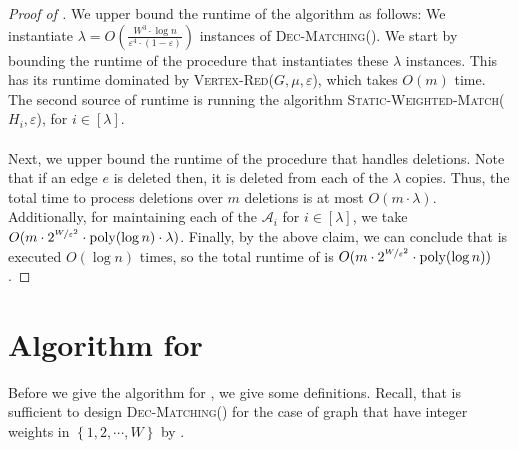 \documentclass[a4paper,11pt]{article}
\newcommand{\paren}[1]{\left ( #1 \right )}
\newcommand{\set}[1]{\ensuremath{\left\{ #1 \right\}}}
\newcommand{\poly}{\mbox{\rm poly}}
\newcommand{\eps}{\varepsilon}
\theoremstyle{definition}
\theoremstyle{definition}
\theoremstyle{definition}
\theoremstyle{definition}
\theoremstyle{definition}
\theoremstyle{definition}
\theoremstyle{definition}
\theoremstyle{definition}
\theoremstyle{definition}
\theoremstyle{definition}
\theoremstyle{definition}
\theoremstyle{definition}
\theoremstyle{definition}
\theoremstyle{definition}
\theoremstyle{definition}
\begin{document}
\begin{proof}[Proof of ]
We upper bound the runtime of the algorithm as follows: We instantiate $\lambda=O\paren{\frac{W^3\cdot \log n}{\eps^4\cdot(1-\eps)}}$ instances of \textsc{Dec-Matching}(). We start by bounding the runtime of the procedure that instantiates these $\lambda$ instances. This has its runtime dominated by \textsc{Vertex-Red}($G,\mu,\eps$), which takes $O(m)$ time. The second source of runtime is running the algorithm \textsc{Static-Weighted-Match}($H_i,\eps$), for $i\in [\lambda]$. \\ \\
Next, we upper bound the runtime of the procedure that handles deletions. Note that if an edge $e$ is deleted then, it is deleted from each of the $\lambda$ copies. Thus, the total time to process deletions over $m$ deletions is at most $O(m\cdot \lambda)$. Additionally, for maintaining each of the $\mathcal{A}_i$ for $i\in [\lambda]$, we take $O(m\cdot 2^{\nicefrac{W}{\eps^2}}\cdot \poly(\log n)\cdot \lambda)$. Finally, by the above claim, we can conclude that  is executed $O(\log n)$ times, so the total runtime of  is $O(m\cdot 2^{\nicefrac{W}{\eps^2}}\cdot \poly(\log n))$.
\end{proof}

\section{Algorithm for }
Before we give the algorithm for , we give some definitions. Recall, that is sufficient to design \textsc{Dec-Matching}() for the case of graph that have integer weights in $\set{1,2,\cdots,W}$ by . 
\end{document}
